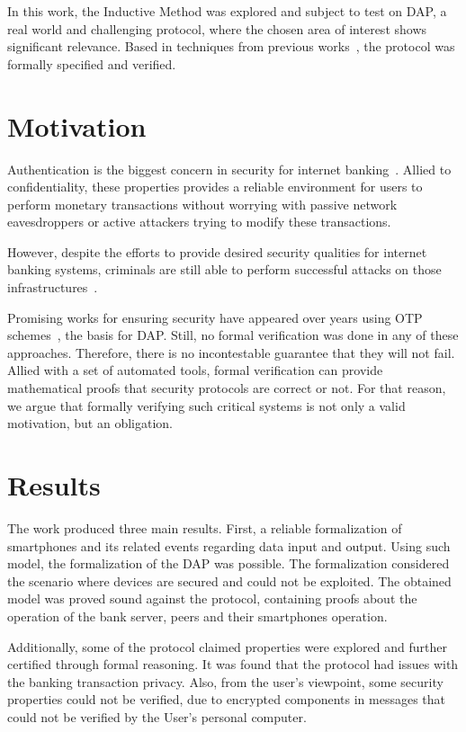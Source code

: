 In this work, the Inductive Method was explored and subject to test on DAP, a real world and challenging protocol, where the chosen area of interest shows significant relevance. Based in techniques from previous works~\cite{BellaPaulson2006, Paulson99, Paulson98}, the protocol was formally specified and verified.




\section{Motivation}
Authentication is the biggest concern in security for internet banking~\cite{Hutchinson2003}. Allied to confidentiality, these properties provides a reliable environment for users to perform monetary transactions without worrying with passive network eavesdroppers or active attackers trying to modify these transactions.

However, despite the efforts to provide desired security qualities for internet banking systems, criminals are still able to perform successful attacks on those infrastructures~\cite{Adham2013}.

Promising works for ensuring security have appeared over years using OTP schemes~\cite{Starnberger2009, LeeHyunLim2010}, the basis for DAP\@. Still, no formal verification was done in any of these approaches. Therefore, there is no incontestable guarantee that they will not fail. Allied with a set of automated tools, formal verification can provide mathematical proofs that security protocols are correct or not. For that reason, we argue that formally verifying such critical systems is not only a valid motivation, but an obligation.




\section{Results}
The work produced three main results. First, a reliable formalization of smartphones and its related events regarding data input and output. Using such model, the formalization of the DAP was possible. The formalization considered the scenario where devices are secured and could not be exploited. The obtained model was proved sound against the protocol, containing proofs about the operation of the bank server, peers and their smartphones operation.

 Additionally, some of the protocol claimed properties were explored and further certified through formal reasoning. It was found that the protocol had issues with the banking transaction privacy. Also, from the user's viewpoint, some security properties could not be verified, due to encrypted components in messages that could not be verified by the User's personal computer.



